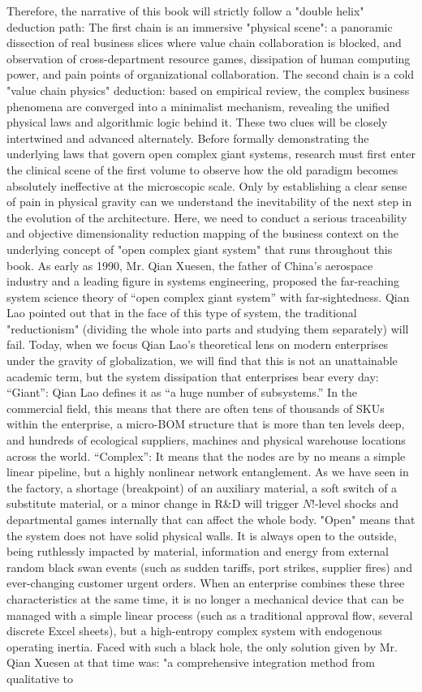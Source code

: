 \documentclass[11pt,a4paper]{article}
\begin{document}
Therefore, the narrative of this book will strictly follow a "double helix" deduction path: The first chain is an immersive "physical scene": a panoramic dissection of real business slices where value chain collaboration is blocked, and observation of cross-department resource games, dissipation of human computing power, and pain points of organizational collaboration. The second chain is a cold "value chain physics" deduction: based on empirical review, the complex business phenomena are converged into a minimalist mechanism, revealing the unified physical laws and algorithmic logic behind it. These two clues will be closely intertwined and advanced alternately. Before formally demonstrating the underlying laws that govern open complex giant systems, research must first enter the clinical scene of the first volume to observe how the old paradigm becomes absolutely ineffective at the microscopic scale. Only by establishing a clear sense of pain in physical gravity can we understand the inevitability of the next step in the evolution of the architecture. Here, we need to conduct a serious traceability and objective dimensionality reduction mapping of the business context on the underlying concept of "open complex giant system" that runs throughout this book. As early as 1990, Mr. Qian Xuesen, the father of China’s aerospace industry and a leading figure in systems engineering, proposed the far-reaching system science theory of “open complex giant system” with far-sightedness. Qian Lao pointed out that in the face of this type of system, the traditional "reductionism" (dividing the whole into parts and studying them separately) will fail. Today, when we focus Qian Lao’s theoretical lens on modern enterprises under the gravity of globalization, we will find that this is not an unattainable academic term, but the system dissipation that enterprises bear every day: “Giant”: Qian Lao defines it as “a huge number of subsystems.” In the commercial field, this means that there are often tens of thousands of SKUs within the enterprise, a micro-BOM structure that is more than ten levels deep, and hundreds of ecological suppliers, machines and physical warehouse locations across the world. “Complex”: It means that the nodes are by no means a simple linear pipeline, but a highly nonlinear network entanglement. As we have seen in the factory, a shortage (breakpoint) of an auxiliary material, a soft switch of a substitute material, or a minor change in R\&D will trigger $N!$-level shocks and departmental games internally that can affect the whole body. "Open" means that the system does not have solid physical walls. It is always open to the outside, being ruthlessly impacted by material, information and energy from external random black swan events (such as sudden tariffs, port strikes, supplier fires) and ever-changing customer urgent orders. When an enterprise combines these three characteristics at the same time, it is no longer a mechanical device that can be managed with a simple linear process (such as a traditional approval flow, several discrete Excel sheets), but a high-entropy complex system with endogenous operating inertia. Faced with such a black hole, the only solution given by Mr. Qian Xuesen at that time was: "a comprehensive integration method from qualitative to 
\end{document}
